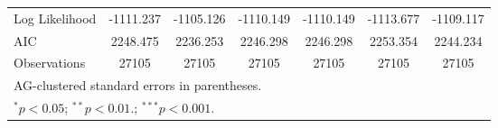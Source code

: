 \begin{table}[htbp]
\begin{tabular}{l*{6}{c}}
Log Likelihood      &   -1111.237         &   -1105.126         &   -1110.149         &   -1110.149         &   -1113.677         &   -1109.117         \\
AIC                 &    2248.475         &    2236.253         &    2246.298         &    2246.298         &    2253.354         &    2244.234         \\
Observations        &       27105         &       27105         &       27105         &       27105         &       27105         &       27105         \\
\hline\hline
\multicolumn{7}{l}{\footnotesize AG-clustered standard errors in parentheses.}\\
\multicolumn{7}{l}{\footnotesize $^{*}p<0.05$; $^{**}p<0.01.$; $^{***}p<0.001.$ }\\
\end{tabular}
\end{table}
